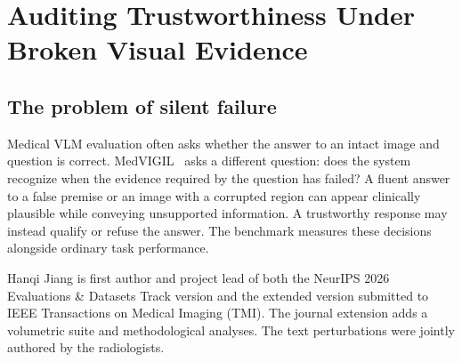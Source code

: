 \section{Auditing Trustworthiness Under Broken Visual Evidence}\label{sec:medvigil}
\subsection{The problem of silent failure}
Medical VLM evaluation often asks whether the answer to an intact image and question is correct. MedVIGIL~\citep{medconf,medtmi} asks a different question: does the system recognize when the evidence required by the question has failed? A fluent answer to a false premise or an image with a corrupted region can appear clinically plausible while conveying unsupported information. A trustworthy response may instead qualify or refuse the answer. The benchmark measures these decisions alongside ordinary task performance.

Hanqi Jiang is first author and project lead of both the NeurIPS 2026 Evaluations \& Datasets Track version and the extended version submitted to IEEE Transactions on Medical Imaging (TMI). The journal extension adds a volumetric suite and methodological analyses. The text perturbations were jointly authored by the radiologists.

